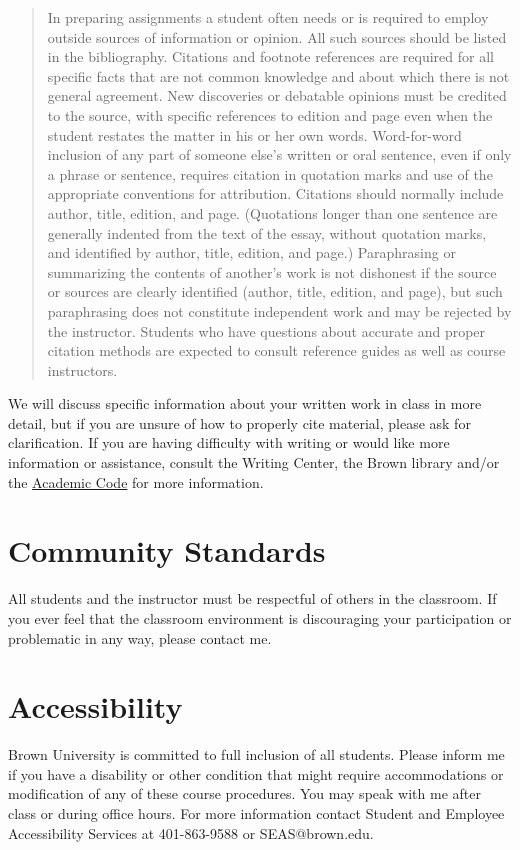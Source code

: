\begin{quote}
In preparing assignments a student often needs or is required to employ outside sources of information or opinion. All such sources should be listed in the bibliography. Citations and footnote references are required for all specific facts that are not common knowledge and about which there is not general agreement. New discoveries or debatable opinions must be credited to the source, with specific references to edition and page even when the student restates the matter in his or her own words. Word-for-word inclusion of any part of someone else's written or oral sentence, even if only a phrase or sentence, requires citation in quotation marks and use of the appropriate conventions for attribution. Citations should normally include author, title, edition, and page. (Quotations longer than one sentence are generally indented from the text of the essay, without quotation marks, and identified by author, title, edition, and page.) Paraphrasing or summarizing the contents of another's work is not dishonest if the source or sources are clearly identified (author, title, edition, and page), but such paraphrasing does not constitute independent work and may be rejected by the instructor. Students who have questions about accurate and proper citation methods are expected to consult reference guides as well as course instructors.
\end{quote}

We will discuss specific information about your written work in class in more detail, but if you are unsure of how to properly cite material, please ask for clarification. If you are having difficulty with writing or would like more information or assistance, consult the Writing Center, the Brown library and/or the \href{https://www.brown.edu/academics/college/degree/policies/academic-code}{Academic Code} for more information.

\section{Community Standards}

All students and the instructor must be respectful of others in the classroom. If you ever feel that the classroom environment is discouraging your participation or problematic in any way, please contact me.

\section{Accessibility}
Brown University is committed to full inclusion of all students. Please inform me if you have a disability or other condition that might require accommodations or modification of any of these course procedures. You may speak with me after class or during office hours. For more information contact Student and Employee Accessibility Services at 401-863-9588 or SEAS@brown.edu.

